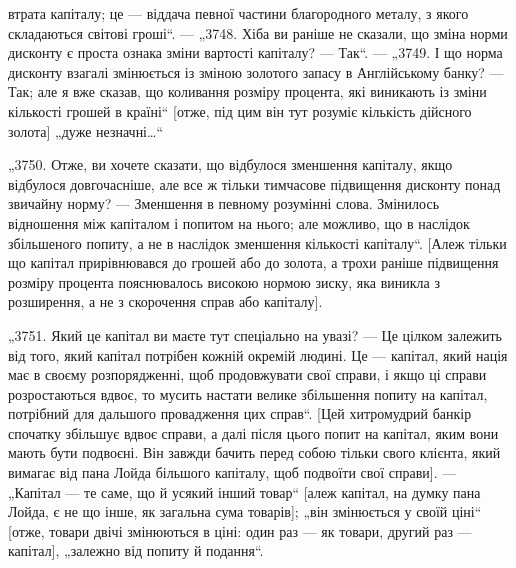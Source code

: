 \parcont{}  %
втрата капіталу; це — віддача певної частини благородного металу, з якого складаються світові
гроші“. — „3748. Хіба ви раніше
не сказали, що зміна норми дисконту є проста ознака зміни вартості капіталу? — Так“. — „3749. І що
норма дисконту взагалі
змінюється із зміною золотого запасу в Англійському банку? —
Так; але я вже сказав, що коливання розміру процента, які виникають із зміни кількості грошей в
країні“ [отже, під цим він
тут розуміє кількість дійсного золота] „дуже незначні\dots{}“

„3750. Отже, ви хочете сказати, що відбулося зменшення капіталу, якщо відбулося довгочасніше, але
все ж тільки тимчасове підвищення дисконту понад звичайну норму? — Зменшення
в певному розумінні слова. Змінилось відношення між капіталом
і попитом на нього; але можливо, що в наслідок збільшеного
попиту, а не в наслідок зменшення кількості капіталу“. [Алеж
тільки що капітал прирівнювався до грошей або до золота, а трохи
раніше підвищення розміру процента пояснювалось високою нормою зиску, яка виникла з розширення, а не
з скорочення справ
або капіталу].

„3751. Який це капітал ви маєте тут спеціально на увазі? —
Це цілком залежить від того, який капітал потрібен кожній
окремій людині. Це — капітал, який нація має в своєму розпорядженні, щоб продовжувати свої справи, і
якщо ці справи розростаються вдвоє, то мусить настати велике збільшення попиту
на капітал, потрібний для дальшого провадження цих справ“. [Цей
хитромудрий банкір спочатку збільшує вдвоє справи, а далі після
цього попит на капітал, яким вони мають бути подвоєні. Він
завжди бачить перед собою тільки свого клієнта, який вимагає
від пана Лойда більшого капіталу, щоб подвоїти свої справи]. —
„Капітал — те саме, що й усякий інший товар“ [алеж капітал, на думку пана Лойда, є не що інше, як
загальна сума товарів]; „він змінюється у своїй ціні“ [отже, товари двічі змінюються
в ціні: один раз — як товари, другий раз — капітал], „залежно
від попиту й подання“.

